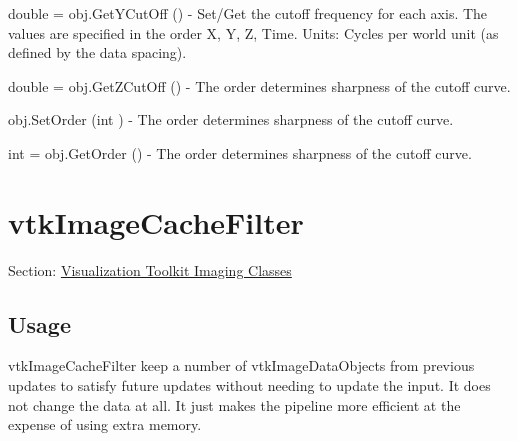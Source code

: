 \begin{DoxyItemize}
\item {\ttfamily double = obj.\-Get\-Y\-Cut\-Off ()} -\/ Set/\-Get the cutoff frequency for each axis. The values are specified in the order X, Y, Z, Time. Units\-: Cycles per world unit (as defined by the data spacing).  
\item {\ttfamily double = obj.\-Get\-Z\-Cut\-Off ()} -\/ The order determines sharpness of the cutoff curve.  
\item {\ttfamily obj.\-Set\-Order (int )} -\/ The order determines sharpness of the cutoff curve.  
\item {\ttfamily int = obj.\-Get\-Order ()} -\/ The order determines sharpness of the cutoff curve.  
\end{DoxyItemize}\hypertarget{vtkimaging_vtkimagecachefilter}{}\section{vtk\-Image\-Cache\-Filter}\label{vtkimaging_vtkimagecachefilter}
Section\-: \hyperlink{sec_vtkimaging}{Visualization Toolkit Imaging Classes} \hypertarget{vtkwidgets_vtkxyplotwidget_Usage}{}\subsection{Usage}\label{vtkwidgets_vtkxyplotwidget_Usage}
vtk\-Image\-Cache\-Filter keep a number of vtk\-Image\-Data\-Objects from previous updates to satisfy future updates without needing to update the input. It does not change the data at all. It just makes the pipeline more efficient at the expense of using extra memory.


